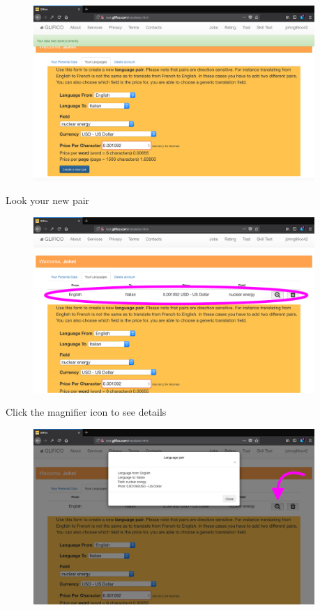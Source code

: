 \documentclass[11 pt, a4paper]{article}
\begin{document}
\begin{figure}[H]
\centering
\includegraphics[width=0.95\textwidth]{translator_pair5.png}
\end{figure}


\clearpage
Look your new pair
\begin{figure}[H]
\centering
\includegraphics[width=0.95\textwidth]{translator_pair6.png}
\end{figure}

Click the magnifier icon to see details
\begin{figure}[H]
\centering
\includegraphics[width=0.95\textwidth]{translator_pair7.png}
\end{figure}
\end{document}
